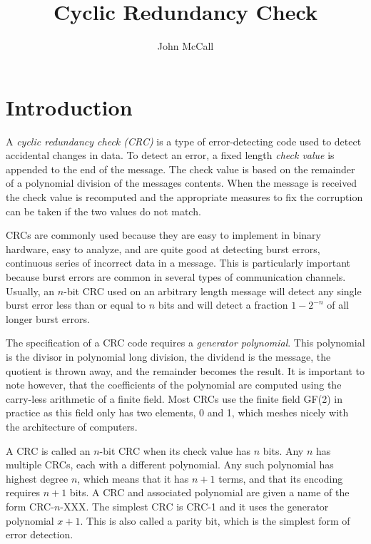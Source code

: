 \documentclass{article}
\title{Cyclic Redundancy Check}
\author{John McCall}
\begin{document}
\maketitle

\section{Introduction}

A \textit{cyclic redundancy check (CRC)} is a type of error-detecting code used to detect accidental changes in data.
To detect an error, a fixed length \textit{check value} is appended to the end of the message. The check value is
based on the remainder of a polynomial division of the messages contents. When the message is received the check value
is recomputed and the appropriate measures to fix the corruption can be taken if the two values do not match.

CRCs are commonly used because they are easy to implement in binary hardware, easy to analyze, and are quite good
at detecting burst errors, continuous series of incorrect data in a message. This is particularly important because 
burst errors are common in several types of communication channels. Usually, an $n$-bit CRC used on an arbitrary
length message will detect any single burst error less than or equal to $n$ bits and will detect a fraction
$1 - 2^{-n}$ of all longer burst errors. 

The specification of a CRC code requires a \textit{generator polynomial}. This polynomial is the divisor in polynomial
long division, the dividend is the message, the quotient is thrown away, and the remainder becomes the result. It is
important to note however, that the coefficients of the polynomial are computed using the carry-less arithmetic of a 
finite field. Most CRCs use the finite field GF(2) in practice as this field only has two elements, 0 and 1, which meshes
nicely with the architecture of computers.

A CRC is called an $n$-bit CRC when its check value has $n$ bits. Any $n$ has multiple CRCs, each with a different polynomial.
Any such polynomial has highest degree $n$, which means that it has $n + 1$ terms, and that its encoding requires $n + 1$ bits.
A CRC and associated polynomial are given a name of the form CRC-$n$-XXX. The simplest CRC is CRC-1 and it uses the generator
polynomial $x + 1$. This is also called a parity bit, which is the simplest form of error detection.
\end{document}
